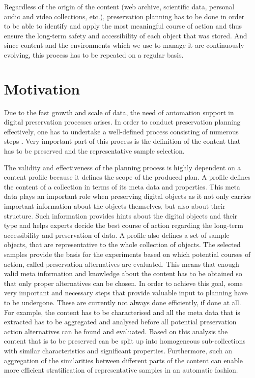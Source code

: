 Regardless of the origin of the content (web archive, scientific data, personal audio and video collections, etc.), preservation planning has to be done in order to be able to identify and apply the most meaningful course of action and thus ensure the long-term safety and accessibility of each object that was stored. And since content and the environments which we use to manage it are continuously evolving, this process has to be repeated on a regular basis.

\section{Motivation}
\label{sec:motivation}
Due to the fast growth and scale of data, the need of automation support in digital preservation processes arises. In order to conduct preservation planning effectively, one has to undertake a well-defined process consisting of numerous steps \cite{Becker:2009fk}. Very important part of this process is the definition of the content that has to be preserved and the representative sample selection. 

The validity and effectiveness of the planning process is highly dependent on a content profile because it defines the scope of the produced plan. A profile defines the content of a collection in terms of its meta data and properties. This meta data plays an important role when preserving digital objects as it not only carries important information about the objects themselves, but also about their structure. Such information provides hints about the digital objects and their type and helps experts decide the best course of action regarding the long-term accessibility and preservation of data. A profile also defines a set of sample objects, that are representative to the whole collection of objects. The selected samples provide the basis for the experiments based on which potential courses of action, called preservation alternatives are evaluated. This means that enough valid meta information and knowledge about the content has to be obtained so that only proper alternatives can be chosen. In order to achieve this goal, some very important and necessary steps that provide valuable input to planning have to be undergone. These are currently not always done efficiently, if done at all. For example, the content has to be characterised and all the meta data that is extracted has to be aggregated and analysed before all potential preservation action alternatives can be found and evaluated. Based on this analysis the content that is to be preserved can be split up into homogeneous sub-collections with similar characteristics and significant properties. Furthermore, such an aggregation of the similarities between different parts of the content can enable more efficient stratification of representative samples in an automatic fashion.


